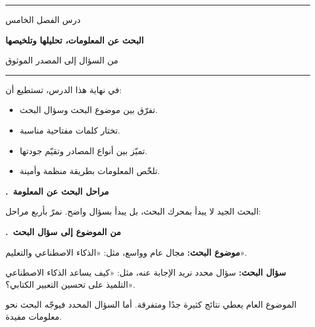 \documentclass[a4paper]{article}
\newcounter{qism}
\newcommand{\qism}[1]{%
    \stepcounter{qism}%
    \par\bigskip
    {\large\khatt\bfseries{\color{asasi}\arabic{qism}.}\ {\color{dakin}#1}}\par
    \vspace{-2pt}{\color{black!20}\rule{\linewidth}{0.6pt}}\par\nopagebreak[4]
    \smallskip}
\newcommand{\unwan}[3]{%
    \begin{center}
        {\color{asasi}\rule{\linewidth}{1.2pt}}\par\medskip
        {\khatt\color{ramadi} #1}\par\smallskip
        {\Large\khatt\bfseries\color{dakin} #2}\par\smallskip
        {\khatt\color{ramadi} #3}\par\medskip
        {\color{asasi}\rule{\linewidth}{1.2pt}}
    \end{center}}
\begin{document}

\unwan{درس الفصل الخامس}
{البحث عن المعلومات، تحليلها وتلخيصها}
{من السؤال إلى المصدر الموثوق}

\begin{ahdaf}
في نهاية هذا الدرس، تستطيع أن:
\begin{itemize}
    \item تفرّق بين موضوع البحث وسؤال البحث.
    \item تختار كلمات مفتاحية مناسبة.
    \item تميّز بين أنواع المصادر وتقيّم جودتها.
    \item تلخّص المعلومات بطريقة منظمة وأمينة.
\end{itemize}
\end{ahdaf}

\qism{مراحل البحث عن المعلومة}

البحث الجيد لا يبدأ بمحرك البحث، بل يبدأ بسؤال واضح.
نمرّ بأربع مراحل:

\begin{center}
\end{center}

\qism{من الموضوع إلى سؤال البحث}

\begin{taarif}
\textbf{موضوع البحث:} مجال عام وواسع، مثل: «الذكاء الاصطناعي والتعليم».

\textbf{سؤال البحث:} سؤال محدد نريد الإجابة عنه،
مثل: «كيف يساعد الذكاء الاصطناعي التلميذ على تحسين التعبير الكتابي؟».
\end{taarif}

الموضوع العام يعطي نتائج كثيرة جدًا ومتفرقة.
أما السؤال المحدد فيوجّه البحث نحو معلومات مفيدة.
\end{document}
